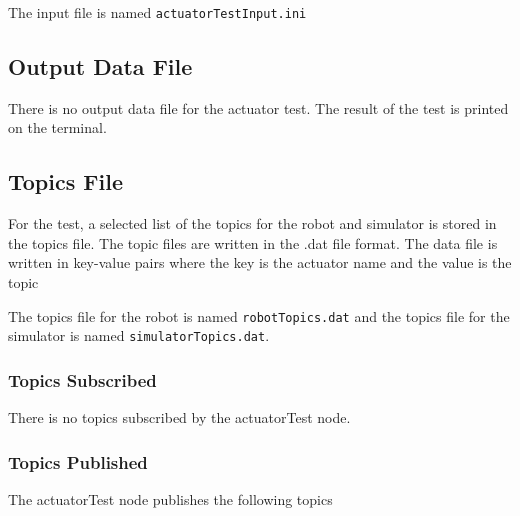 \documentclass{CSSRforAfrica}
\begin{document}
The input file is named \texttt{actuatorTestInput.ini}

\subsection*{Output Data File}
There is no output data file for the actuator test. The result of the test is printed on the terminal.

\subsection*{Topics File}
For the test, a selected list of the topics for the robot and simulator is stored in the topics file. The topic files are written in the .dat file format.
The data file is written in key-value pairs where the key is the actuator name and the value is the topic

The topics file for the robot is named \texttt{robotTopics.dat} and the topics file for the simulator is named \texttt{simulatorTopics.dat}.

\subsubsection*{Topics Subscribed}
There is no topics subscribed by the actuatorTest node.

\newpage

\subsubsection*{Topics Published}
The actuatorTest node publishes the following topics
\end{document}
